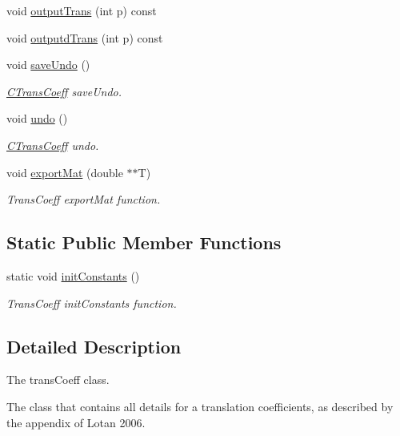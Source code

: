 \begin{DoxyCompactItemize}
void \hyperlink{classCTransCoeff_a100c9adb6d3476193842504ddf0a1e99}{output\-Trans} (int p) const 
\item 
void \hyperlink{classCTransCoeff_af80128c89b9785e7d4a0e93702ac523f}{outputd\-Trans} (int p) const 
\item 
void \hyperlink{classCTransCoeff_abdfd0c88d82daed4913df4859087103d}{save\-Undo} ()
\begin{DoxyCompactList}\small\item\em \hyperlink{classCTransCoeff}{C\-Trans\-Coeff} save\-Undo. \end{DoxyCompactList}\item 
void \hyperlink{classCTransCoeff_ac310aa175fd393365941e426e96a290b}{undo} ()
\begin{DoxyCompactList}\small\item\em \hyperlink{classCTransCoeff}{C\-Trans\-Coeff} undo. \end{DoxyCompactList}\item 
void \hyperlink{classCTransCoeff_a16bd5045a9ba639775224cc7f121f4c6}{export\-Mat} (double $\ast$$\ast$T)
\begin{DoxyCompactList}\small\item\em Trans\-Coeff export\-Mat function. \end{DoxyCompactList}\end{DoxyCompactItemize}
\subsection*{Static Public Member Functions}
\begin{DoxyCompactItemize}
\item 
static void \hyperlink{classCTransCoeff_ae4be8ef01d28f5b8d9b4282252575bee}{init\-Constants} ()
\begin{DoxyCompactList}\small\item\em Trans\-Coeff init\-Constants function. \end{DoxyCompactList}\end{DoxyCompactItemize}


\subsection{Detailed Description}
The trans\-Coeff class. 

The class that contains all details for a translation coefficients, as described by the appendix of Lotan 2006. 

